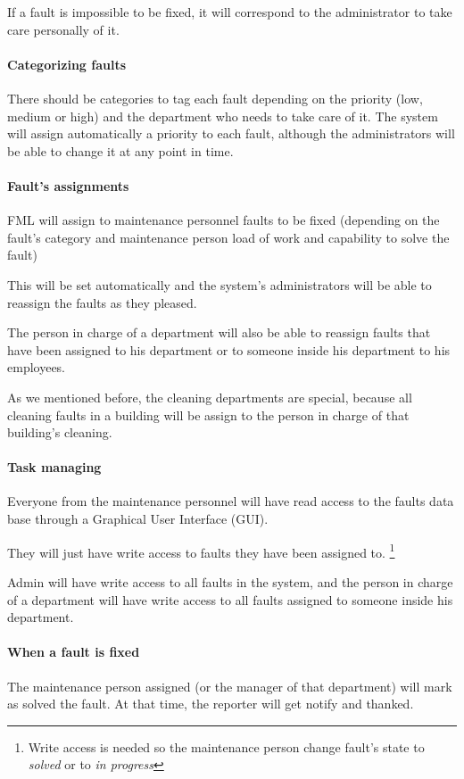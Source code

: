 If a fault is impossible to be fixed, it will correspond to the administrator to take care personally of it.


\paragraph{Categorizing faults} There should be categories to tag each fault depending on the priority (low, medium or high) and the department who needs to take care of it. The system will assign automatically a priority to each fault, although the administrators will be able to change it at any point in time.

\paragraph{Fault's assignments} FML will assign to maintenance personnel faults to be fixed (depending on the fault's category and maintenance person load of work and capability to solve the fault)

This will be set automatically and the system's administrators will be able to reassign the faults as they pleased.

The person in charge of a department will also be able to reassign faults that have been assigned to his department or to someone inside his department to his employees.

As we mentioned before, the cleaning departments are special, because all cleaning faults in a building will be assign to the person in charge of that building's cleaning.


\paragraph{Task managing} Everyone from the maintenance personnel will have read access to the faults data base through a Graphical User Interface (GUI).

They will just have write access to faults they have been assigned to. \footnote{Write access is needed so the maintenance person change fault's state to \textit{solved} or to \textit{in progress}}

Admin will have write access to all faults in the system, and the person in charge of a department will have write access to all faults assigned to someone inside his department.

\paragraph{When a fault is fixed} The maintenance person assigned (or the manager of that department) will mark as solved the fault. At that time, the reporter will get notify and thanked.


